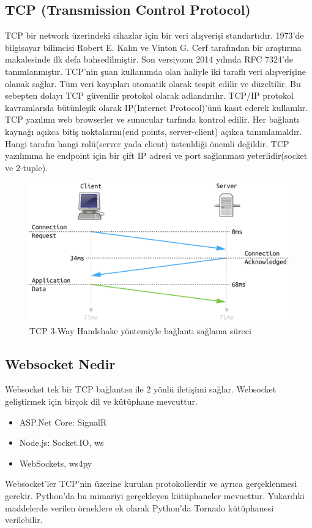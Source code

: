 \subsection{TCP (Transmission Control Protocol) }
TCP bir network üzerindeki cihazlar için bir veri alışverişi standartıdır. 1973'de bilgisayar bilimcisi Robert E. Kahn ve Vinton G. Cerf tarafından bir araştırma makalesinde ilk defa bahsedilmiştir. Son versiyonu 2014 yılında RFC 7324'de\cite{RFC} tanımlanmıştır. TCP'nin şuan kullanımda olan haliyle iki taraflı veri alışverişine olanak sağlar. Tüm veri kayıpları otomatik olarak tespit edilir ve düzeltilir. Bu sebepten dolayı TCP güvenilir protokol olarak adlandırılır. TCP/IP protokol kavramlarıda bütünleşik olarak IP(Internet Protocol)'ünü kasıt ederek kullanılır. 
\newline
\newline
TCP yazılımı web browserler ve sunucular tarfında kontrol edilir. Her bağlantı kaynağı açıkca bitiş noktalarını(end points, server-client) açıkca tanımlamaldır. Hangi tarafın hangi rolü(server yada client) üstenldiği önemli değildir. TCP yazılımına he endpoint için bir çift IP adresi ve port sağlanması yeterlidir(socket ve 2-tuple).\cite{RFC}
\begin{figure}[h]
    \centering
    \includegraphics[width=\textwidth]{Report/images/tcp.png}
    \caption{TCP 3-Way Handshake yöntemiyle bağlantı sağlama süreci}
    \label{fig:mesh1}
\end{figure}
\subsection{Websocket Nedir}
Websocket tek bir TCP bağlantısı ile 2 yönlü iletişimi sağlar. Websocket geliştirmek için birçok dil ve kütüphane mevcuttur.\cite{websocket1}
\begin{itemize}
  \item ASP.Net Core: SignalR
  \item Node.js: Socket.IO, ws
  \item WebSockets, ws4py
\end{itemize}
Websocket'ler TCP'nin üzerine kurulan protokollerdir ve ayrıca gerçeklenmesi gerekir. Python'da bu mimariyi gerçekleyen kütüphaneler mevucttur. Yukardıki maddelerde verilen örneklere ek olarak Python'da Tornado kütüphanesi verilebilir\cite{websocket2}.
